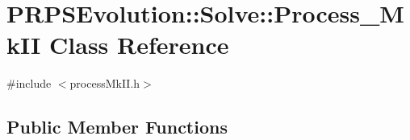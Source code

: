 \hypertarget{class_p_r_p_s_evolution_1_1_solve_1_1_process___mk_i_i}{\section{\-P\-R\-P\-S\-Evolution\-:\-:\-Solve\-:\-:\-Process\-\_\-\-Mk\-I\-I \-Class \-Reference}
\label{class_p_r_p_s_evolution_1_1_solve_1_1_process___mk_i_i}
}


{\ttfamily \#include $<$process\-Mk\-I\-I.\-h$>$}

\subsection*{\-Public \-Member \-Functions}
